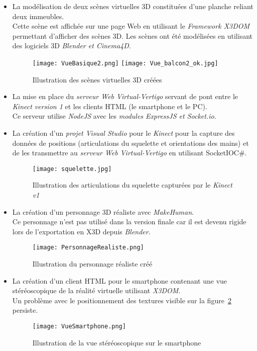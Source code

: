 \begin{itemize}
\item La modélisation de deux scènes virtuelles 3D constituées d'une planche reliant deux immeubles. \\
Cette scène est affichée sur une page Web en utilisant le \textit{Framework X3DOM} permettant d'afficher des scènes 3D. Les scènes ont été modélisées en utilisant des logiciels 3D \textit{Blender et Cinema4D}.
\begin{figure}[H]
\centering
\texttt{[image: VueBasique2.png]}
\texttt{[image: Vue\_balcon2\_ok.jpg]}
\caption{\label{vue} Illustration des scènes virtuelles 3D créées}
\end{figure}

\item La mise en place du \textit{serveur Web Virtual-Vertigo} servant de pont entre le \textit{Kinect version 1} et les clients HTML (le \textsf{smartphone} et le PC). \\
Ce serveur utilise \textit{NodeJS} avec les \textit{modules ExpressJS et Socket.io}.

\item La création d'un \textit{projet Visual Studio} pour le \textit{Kinect} pour la capture des données de positions (articulations du squelette et orientations des mains) et de les transmettre au \textit{serveur Web Virtual-Vertigo} en utilisant SocketIOC\#.
\begin{figure}[H]
\centering
\texttt{[image: squelette.jpg]}
\caption{Illustration des articulations du squelette capturées par le \textit{Kinect v1}}
\end{figure}

\item La création d'un personnage 3D réaliste avec \textit{MakeHuman}.\\
Ce personnage n'est pas utilisé dans la version finale car il est devenu rigide lors de l'exportation en X3D depuis \textit{Blender}.
\begin{figure}[H]
\centering
\texttt{[image: PersonnageRealiste.png]}
\caption{Illustration du personnage réaliste créé}
\end{figure}

\item La création d'un client HTML pour le \textsf{smartphone} contenant une vue stéréoscopique de la réalité virtuelle utilisant \textit{X3DOM}. \\ Un problème avec le positionnement des textures visible sur la figure~\ref{vueSmartphone} persiste.
\begin{figure}[H]
\centering
\texttt{[image: VueSmartphone.png]}
\caption{\label{vueSmartphone} Illustration de la vue stéréoscopique sur le \textsf{smartphone}}
\end{figure}


\end{itemize}
